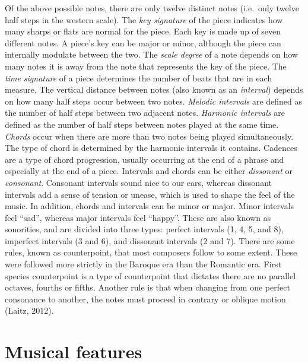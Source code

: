 \documentclass[12pt,twoside]{reedthesis}
\theoremstyle{definition}
\theoremstyle{definition}
\theoremstyle{definition}
\theoremstyle{remark}
\begin{document}
Of the above possible notes, there are only twelve distinct notes
(i.e.~only twelve half steps in the western scale). The \emph{key
signature} of the piece indicates how many sharps or flats are normal
for the piece. Each key is made up of seven different notes. A piece's
key can be major or minor, although the piece can internally modulate
between the two. The \emph{scale degree} of a note depends on how many
notes it is away from the note that represents the key of the piece. The
\emph{time signature} of a piece determines the number of beats that are
in each measure. The vertical distance between notes (also known as an
\emph{interval}) depends on how many half steps occur between two notes.
\emph{Melodic intervals} are defined as the number of half steps between
two adjacent notes. \emph{Harmonic intervals} are defined as the number
of half steps between notes played at the same time. \emph{Chords} occur
when there are more than two notes being played simultaneously. The type
of chord is determined by the harmonic intervals it contains. Cadences
are a type of chord progression, usually occurring at the end of a
phrase and especially at the end of a piece. Intervals and chords can be
either \emph{dissonant} or \emph{consonant}. Consonant intervals sound
nice to our ears, whereas dissonant intervals add a sense of tension or
unease, which is used to shape the feel of the music. In addition,
chords and intervals can be minor or major. Minor intervals feel
``sad'', whereas major intervals feel ``happy''. These are also known as
sonorities, and are divided into three types: perfect intervals (1, 4,
5, and 8), imperfect intervals (3 and 6), and dissonant intervals (2 and
7). There are some rules, known as counterpoint, that most composers
follow to some extent. These were followed more strictly in the Baroque
era than the Romantic era. First species counterpoint is a type of
counterpoint that dictates there are no parallel octaves, fourths or
fifths. Another rule is that when changing from one perfect consonance
to another, the notes must proceed in contrary or oblique motion (Laitz,
2012).

\section{Musical features}\label{musical-features}
\end{document}
